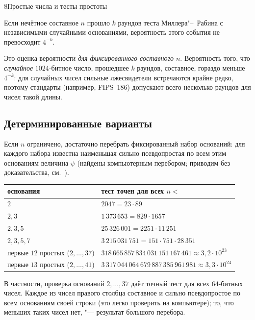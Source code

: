 \begin{lecture}{8}{Простые числа и тесты простоты}
\begin{corollary}
Если нечётное составное $n$ прошло $k$ раундов теста Миллера"--~Рабина с независимыми
случайными основаниями, вероятность этого события не превосходит $4^{-k}$.
\end{corollary}

\begin{remark}
Это оценка вероятности \emph{для фиксированного составного $n$}. Вероятность того, что
\emph{случайное} $1024$-битное число, прошедшее $k$ раундов, составное, гораздо меньше $4^{-k}$:
для случайных чисел сильные лжесвидетели встречаются крайне редко, поэтому стандарты
(например, FIPS~186) допускают всего несколько раундов для чисел такой длины.
\end{remark}

\subsection{Детерминированные варианты}

Если $n$ ограничено, достаточно перебрать фиксированный набор оснований: для каждого
набора известна наименьшая сильно псевдопростая по всем этим основаниям величина
$\psi$ (найдены компьютерным перебором; приводим без доказательства, см.~\cite{sorenson-webster}).

\begin{center}
\begin{tabular}{l|l}
  основания & тест точен для всех $n <{}$ \\ \hline
  $2$ & $2047 = 23 \cdot 89$ \\
  $2, 3$ & $1\,373\,653 = 829 \cdot 1657$ \\
  $2, 3, 5$ & $25\,326\,001 = 2251 \cdot 11\,251$ \\
  $2, 3, 5, 7$ & $3\,215\,031\,751 = 151 \cdot 751 \cdot 28\,351$ \\
  первые $12$ простых ($2, \ldots, 37$) & $318\,665\,857\,834\,031\,151\,167\,461 \approx 3{,}2 \cdot 10^{23}$ \\
  первые $13$ простых ($2, \ldots, 41$) & $3\,317\,044\,064\,679\,887\,385\,961\,981 \approx 3{,}3 \cdot 10^{24}$
\end{tabular}
\end{center}

В частности, проверка оснований $2, \ldots, 37$ даёт точный тест для всех $64$-битных чисел.
Каждое из чисел правого столбца составное и сильно псевдопростое по всем основаниям своей
строки (это легко проверить на компьютере); то, что меньших таких чисел нет, "--- результат
большого перебора.


\end{lecture}
